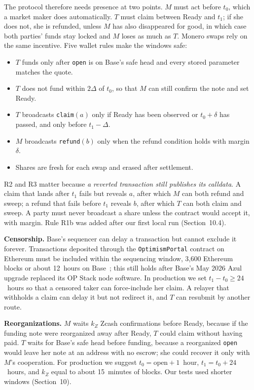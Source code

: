 \documentclass[10pt,letterpaper]{article}
\newcommand{\fn}[1]{\texttt{#1}}
\begin{document}
The protocol therefore needs presence at two points. $M$ must act before $t_0$, which a market maker
does automatically. $T$ must claim between Ready and $t_1$; if she does not, she is refunded, unless
$M$ has also disappeared for good, in which case both parties' funds stay locked and $M$ loses as
much as $T$. Monero swaps rely on the same incentive. Five wallet rules make the windows safe:
\begin{itemize}\setlength\itemsep{0.1em}
\item[\textbf{R1}] $T$ funds only after \fn{open} is on Base's safe head and every stored parameter
matches the quote.
\item[\textbf{R1b}] $T$ does not fund within $2\Delta$ of $t_0$, so that $M$ can still confirm the
note and set Ready.
\item[\textbf{R2}] $T$ broadcasts \fn{claim}$(a)$ only if Ready has been observed or $t_0 + \delta$ has
passed, and only before $t_1 - \Delta$.
\item[\textbf{R3}] $M$ broadcasts \fn{refund}$(b)$ only when the refund condition holds with margin
$\delta$.
\item[\textbf{R4}] Shares are fresh for each swap and erased after settlement.
\end{itemize}
R2 and R3 matter because \emph{a reverted transaction still publishes its calldata}. A claim that
lands after $t_1$ fails but reveals $a$, after which $M$ can both refund and sweep; a refund that fails
before $t_1$ reveals $b$, after which $T$ can both claim and sweep. A party must never broadcast a
share unless the contract would accept it, with margin. Rule R1b was added after our first local run
(Section~10.4).

\textbf{Censorship.} Base's sequencer can delay a transaction but cannot exclude it forever.
Transactions deposited through the \fn{OptimismPortal} contract on Ethereum must be included within
the sequencing window, 3{,}600 Ethereum blocks or about 12~hours on Base~\cite{basereliab,opforced};
this still holds after Base's May 2026 Azul upgrade replaced its OP Stack node software. In
production we set $t_1 - t_0 \geq 24$~hours so that a censored taker can force-include her claim. A
relayer that withholds a claim can delay it but not redirect it, and $T$ can resubmit by another
route.

\textbf{Reorganizations.} $M$ waits $k_Z$ Zcash confirmations before Ready, because if the funding
note were reorganized away after Ready, $T$ could claim without having paid. $T$ waits for Base's
safe head before funding, because a reorganized \fn{open} would leave her note at an address with no
escrow; she could recover it only with $M$'s cooperation. For production we suggest
$t_0 = \text{open} + 1$~hour, $t_1 = t_0 + 24$~hours, and $k_Z$ equal to about 15~minutes of blocks.
Our tests used shorter windows (Section~10).
\end{document}
